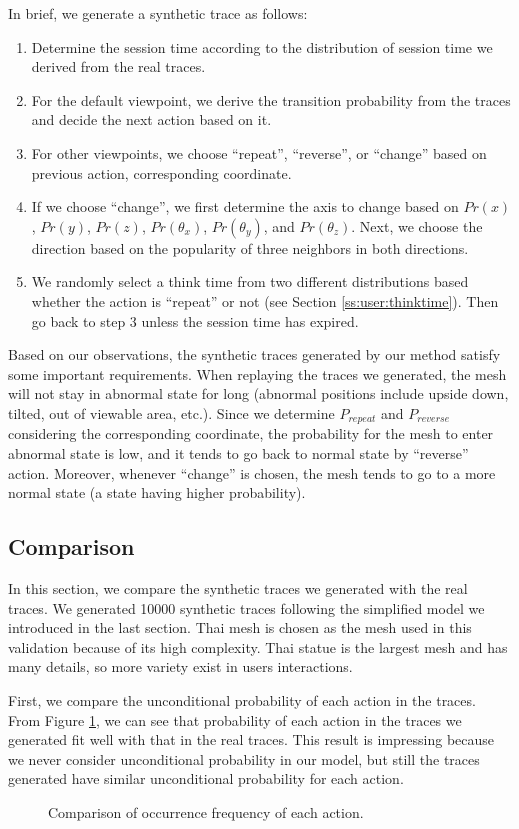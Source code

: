 In brief, we generate a synthetic trace as follows:
\begin{enumerate}
    \item Determine the session time according to the distribution of session time we derived from the real traces.
    \item For the default viewpoint, we derive the transition probability from the traces and decide the
        next action based on it.
    \item For other viewpoints, we choose ``repeat'', ``reverse'', or ``change'' 
        based on {previous action, corresponding coordinate}.
    \item If we choose ``change'', 
        we first determine the axis to change based on $Pr(x)$, $Pr(y)$, $Pr(z)$, 
        $Pr(\theta_x)$, $Pr(\theta_y)$, and $Pr(\theta_z)$. 
        Next, we choose the direction based on the popularity of three
        neighbors in both directions.
    \item We randomly select a think time from two different distributions 
        based whether the action is ``repeat'' or not (see Section \ref{ss:user:thinktime}).
        Then go back to step 3 unless the session time has expired.
\end{enumerate}

Based on our observations, the synthetic traces generated by our method satisfy some important requirements. 
When replaying the traces we generated, the mesh will not stay in abnormal state for long 
(abnormal positions include upside down, tilted, out of viewable area, etc.).
Since we determine $P_{repeat}$ and $P_{reverse}$ considering the corresponding coordinate,
the probability for the mesh to enter abnormal state is low, and it tends to go back to normal state
by ``reverse'' action. 
Moreover, whenever ``change'' is chosen, 
the mesh tends to go to a more normal state (a state having higher probability). 

\subsection{Comparison}
In this section, we compare the synthetic traces we generated with the real traces.
We generated 10000 synthetic traces following the simplified model we introduced in the last section.
Thai mesh is chosen as the mesh used in this validation because of its high complexity. Thai statue 
is the largest mesh and has many details, so more variety exist in users interactions. 

First, we compare the unconditional probability of each action in the traces. 
From Figure \ref{f:user:frequency_comp}, we can see that probability of each action in the traces we generated
fit well with that in the real traces. 
This result is impressing because we never consider unconditional probability in our model, but  
still the traces generated have similar unconditional probability for each action.
\begin{figure}[htdp!]
    \centering
    \caption{Comparison of occurrence frequency of each action.}
    \label{f:user:frequency_comp}
\end{figure}

